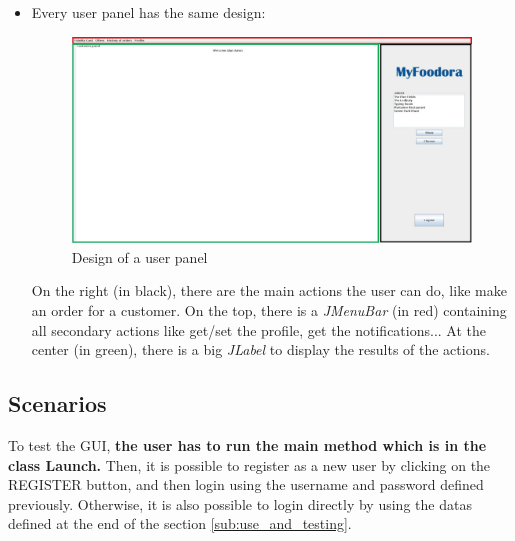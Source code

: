 \begin{itemize}
	\item Every user panel has the same design:
\begin{figure}[H]
	\centering
	\includegraphics[width=0.8\linewidth]{./ima/designUserPanel.jpg}
	\caption{Design of a user panel}
	\label{design_of_user_panel}
\end{figure}
On the right (in black), there are the main actions the user can do, like make an order for a customer. On the top, there is a \textit{JMenuBar} (in red) containing all secondary actions like get/set the profile, get the notifications... At the center (in green), there is a big \textit{JLabel} to display the results of the actions.


\end{itemize}

\subsection{Scenarios}
To test the GUI, \textbf{the user has to run the main method which is in the class Launch.} Then, it is possible to register as a new user by clicking on the REGISTER button, and then login using the username and password defined previously. Otherwise, it is also possible to login directly by using the datas defined at the end of the section \ref{sub:use_and_testing}.
\label{sub:scenarios}
